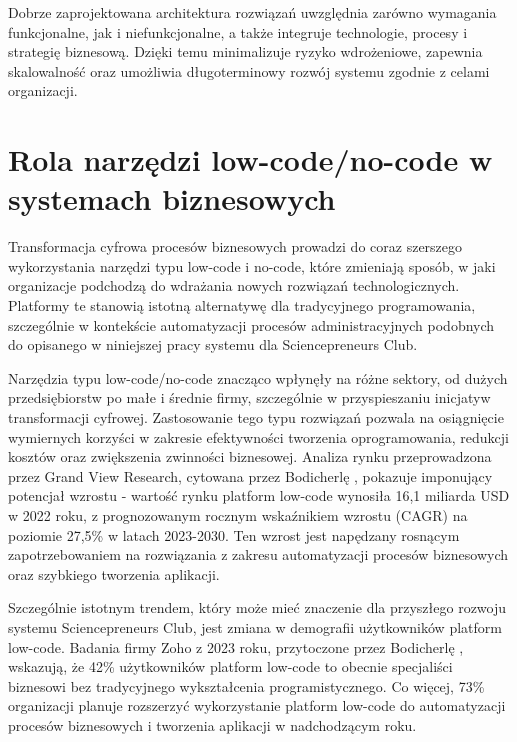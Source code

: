 Dobrze zaprojektowana architektura rozwiązań uwzględnia zarówno wymagania funkcjonalne, jak i niefunkcjonalne, a także integruje technologie, procesy i strategię biznesową. Dzięki temu minimalizuje ryzyko wdrożeniowe, zapewnia skalowalność oraz umożliwia długoterminowy rozwój systemu zgodnie z celami organizacji.\cite{gupta2023}

\section{Rola narzędzi low-code/no-code w systemach biznesowych}

Transformacja cyfrowa procesów biznesowych prowadzi do coraz szerszego wykorzystania narzędzi typu low-code i no-code, które zmieniają sposób, w jaki organizacje podchodzą do wdrażania nowych rozwiązań technologicznych. \parencite[s. 171]{bodicherla2025} Platformy te stanowią istotną alternatywę dla tradycyjnego programowania, szczególnie w kontekście automatyzacji procesów administracyjnych podobnych do opisanego w niniejszej pracy systemu dla Sciencepreneurs Club.

Narzędzia typu low-code/no-code znacząco wpłynęły na różne sektory, od dużych przedsiębiorstw po małe i średnie firmy, szczególnie w przyspieszaniu inicjatyw transformacji cyfrowej. Zastosowanie tego typu rozwiązań pozwala na osiągnięcie wymiernych korzyści w zakresie efektywności tworzenia oprogramowania, redukcji kosztów oraz zwiększenia zwinności biznesowej.
Analiza rynku przeprowadzona przez Grand View Research, cytowana przez Bodicherlę \parencite[s. 173]{bodicherla2025}, pokazuje imponujący potencjał wzrostu - wartość rynku platform low-code wynosiła 16,1 miliarda USD w 2022 roku, z prognozowanym rocznym wskaźnikiem wzrostu (CAGR) na poziomie 27,5\% w latach 2023-2030. Ten wzrost jest napędzany rosnącym zapotrzebowaniem na rozwiązania z zakresu automatyzacji procesów biznesowych oraz szybkiego tworzenia aplikacji.

Szczególnie istotnym trendem, który może mieć znaczenie dla przyszłego rozwoju systemu Sciencepreneurs Club, jest zmiana w demografii użytkowników platform low-code. Badania firmy Zoho z 2023 roku, przytoczone przez Bodicherlę \parencite[s. 173]{bodicherla2025}, wskazują, że 42\% użytkowników platform low-code to obecnie specjaliści biznesowi bez tradycyjnego wykształcenia programistycznego. Co więcej, 73\% organizacji planuje rozszerzyć wykorzystanie platform low-code do automatyzacji procesów biznesowych i tworzenia aplikacji w nadchodzącym roku.

